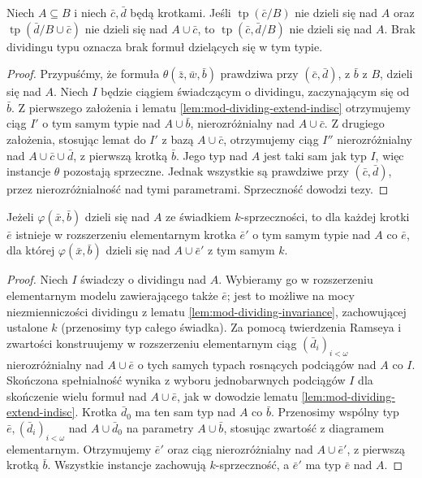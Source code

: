 \begin{lemat}
\label{lem:mod-nondividing-concatenation}
Niech $A\subseteq B$ i niech $\bar c,\bar d$
będą krotkami. Jeśli
$\operatorname{tp}(\bar c/B)$ nie dzieli się
nad $A$ oraz
$\operatorname{tp}(\bar d/B\cup\bar c)$
nie dzieli się nad $A\cup\bar c$,
to $\operatorname{tp}(\bar c,\bar d/B)$
nie dzieli się nad $A$.
Brak dividingu typu oznacza brak formuł
dzielących się w tym typie.
\end{lemat}
\begin{proof}
Przypuśćmy, że formuła
$\theta(\bar z,\bar w,\bar b)$
prawdziwa przy $(\bar c,\bar d)$,
z $\bar b$ z $B$, dzieli się nad $A$.
Niech $I$ będzie ciągiem świadczącym
o dividingu, zaczynającym się od $\bar b$.
Z pierwszego założenia i lematu
\ref{lem:mod-dividing-extend-indisc}
otrzymujemy ciąg $I'$ o tym samym typie
nad $A\cup\bar b$, nierozróżnialny
nad $A\cup\bar c$.
Z drugiego założenia, stosując lemat
do $I'$ z bazą $A\cup\bar c$,
otrzymujemy ciąg $I''$ nierozróżnialny
nad $A\cup\bar c\cup\bar d$,
z pierwszą krotką $\bar b$.
Jego typ nad $A$ jest taki sam jak typ $I$,
więc instancje $\theta$ pozostają sprzeczne.
Jednak wszystkie są prawdziwe przy
$(\bar c,\bar d)$, przez nierozróżnialność
nad tymi parametrami. Sprzeczność
dowodzi tezy.
\end{proof}

\begin{lemat}
\label{lem:mod-dividing-move-base}
Jeżeli $\varphi(\bar x,\bar b)$
dzieli się nad $A$ ze świadkiem $k$-sprzeczności,
to dla każdej krotki $\bar e$ istnieje
w rozszerzeniu elementarnym krotka $\bar e'$
o tym samym typie nad $A$ co $\bar e$,
dla której $\varphi(\bar x,\bar b)$
dzieli się nad $A\cup\bar e'$ z tym samym $k$.
\end{lemat}
\begin{proof}
Niech $I$ świadczy o dividingu nad $A$.
Wybieramy go w rozszerzeniu elementarnym modelu
zawierającego także $\bar e$; jest to możliwe
na mocy niezmienniczości dividingu z lematu
\ref{lem:mod-dividing-invariance}, zachowującej
ustalone $k$ (przenosimy typ całego świadka).
Za pomocą twierdzenia Ramseya i zwartości
konstruujemy w rozszerzeniu elementarnym
ciąg $(\bar d_i)_{i<\omega}$ nierozróżnialny
nad $A\cup\bar e$ o tych samych typach
rosnących podciągów nad $A$ co $I$.
Skończona spełnialność wynika z wyboru
jednobarwnych podciągów $I$ dla skończenie
wielu formuł nad $A\cup\bar e$,
jak w dowodzie lematu
\ref{lem:mod-dividing-extend-indisc}.
Krotka $\bar d_0$ ma ten sam typ nad $A$
co $\bar b$. Przenosimy wspólny typ
$\bar e,(\bar d_i)_{i<\omega}$ nad
$A\cup\bar d_0$ na parametry $A\cup\bar b$,
stosując zwartość z diagramem elementarnym.
Otrzymujemy $\bar e'$ oraz ciąg
nierozróżnialny nad $A\cup\bar e'$,
z pierwszą krotką $\bar b$.
Wszystkie instancje zachowują
$k$-sprzeczność, a $\bar e'$ ma typ
$\bar e$ nad $A$.
\end{proof}

